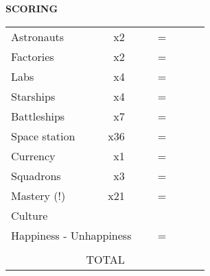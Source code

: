 \begin{flushleft}
  \textbf{SCORING}
\end{flushleft}
\begin{tabular}{lrllrlll}
Astronauts       & x2                   &           &  & =                     &  &                       &  \\ \cline{3-4} \cline{6-7}
Factories       & x2                   &           &  & =                     &  &                       &  \\ \cline{3-4} \cline{6-7}
Labs             & x4                   &           &  & =                     &  &                       &  \\ \cline{3-4} \cline{6-7}
Starships   & x4                   &           &  & =                     &  &                       &  \\ \cline{3-4} \cline{6-7}
Battleships    & x7                   &           &  & =                     &  &                       &  \\ \cline{3-4} \cline{6-7}
Space station      & x36                  &           &  & =                     &  &                       &  \\ \cline{3-4} \cline{6-7}
Currency        & x1                   &           &  & =                     &  &                       &  \\ \cline{3-4} \cline{6-7}
Squadrons      & x3                   &           &  & =                     &  &                       &  \\ \cline{3-4} \cline{6-7}
Mastery (!) & x21                  &           &  & =                     &  &                       &  \\ \cline{3-4} \cline{6-7}
Culture     &                      &           &  &                       &  &                       &  \\ \cline{6-7}
\multicolumn{4}{l}{Happiness - Unhappiness}       & =                     &  &                       &  \\ \cline{6-7}
            & \multicolumn{1}{l}{} &           &  & \multicolumn{1}{l}{}  &  &                       &  \\ \cline{6-7}
            & TOTAL                & \textbf{} &  & \multicolumn{1}{r|}{} &  & \multicolumn{1}{l|}{} &  \\ \cline{6-7}
\end{tabular}
